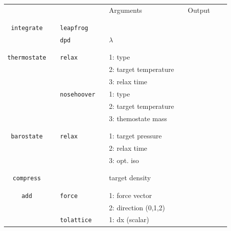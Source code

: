 \documentclass[11pt]{article}
\begin{document}
\clearpage
\begin{center}
  
  \begin{tabular}{cclclclll}
    {\color{red}{\textbf{Action}}} && {\color{blue}{Specifier}} && Arguments && Output \\
                                   && && && \\
    \hline
                                   && && && \\
    \verb!integrate! && \verb!leapfrog! && && \\
    $\mbox{}$ && \verb!dpd!      && $\lambda$ && \\
                                   && && && \\
    \hline
                                   && && && \\
    \verb!thermostate! && \verb!relax! && 1: type && \\
    $\mbox{}$   &&       && 2: target temperature && \\
    $\mbox{}$  &&        && 3: relax time && \\
    $\mbox{}$  && \verb!nosehoover! && 1: type && \\
    $\mbox{}$  &&            && 2: target temperature && \\
    $\mbox{}$  &&            && 3: themostate mass && \\
                                   && && && \\
    \hline
                                   && && && \\
    \verb!barostate! && \verb!relax! && 1: target pressure && \\
    $\mbox{}$   &&       && 2: relax time && \\
    $\mbox{}$  &&        && 3: opt. iso && \\
                                   && && && \\
    \hline
                                   && && && \\
    \verb!compress! && && target density && \\
                                   && && && \\
    \hline
                                   && && && \\
    \verb!add! && \verb!force! && 1: force vector && \\
    $\mbox{}$   &&             && 2: direction (0,1,2) && \\
    $\mbox{}$   && \verb!tolattice! && 1: dx (scalar) && \\

\end{tabular}
\end{center}
\end{document}
